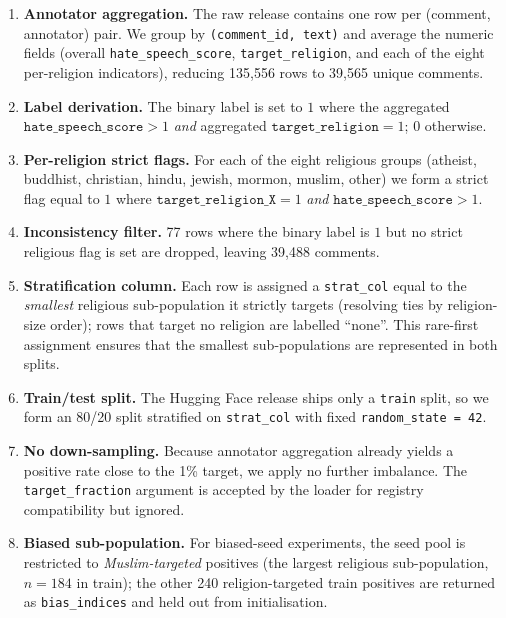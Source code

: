\documentclass[11pt]{article}
\begin{document}
\begin{enumerate}
    \item \textbf{Annotator aggregation.} The raw release contains one row per (comment, annotator) pair. We group by \texttt{(comment\_id, text)} and average the numeric fields (overall \texttt{hate\_speech\_score}, \texttt{target\_religion}, and each of the eight per-religion indicators), reducing 135{,}556 rows to 39{,}565 unique comments.
    \item \textbf{Label derivation.} The binary label is set to $1$ where the aggregated $\texttt{hate\_speech\_score} > 1$ \emph{and} aggregated $\texttt{target\_religion} = 1$; $0$ otherwise.
    \item \textbf{Per-religion strict flags.} For each of the eight religious groups (atheist, buddhist, christian, hindu, jewish, mormon, muslim, other) we form a strict flag equal to $1$ where $\texttt{target\_religion\_X} = 1$ \emph{and} $\texttt{hate\_speech\_score} > 1$.
    \item \textbf{Inconsistency filter.} 77 rows where the binary label is $1$ but no strict religious flag is set are dropped, leaving 39{,}488 comments.
    \item \textbf{Stratification column.} Each row is assigned a \texttt{strat\_col} equal to the \emph{smallest} religious sub-population it strictly targets (resolving ties by religion-size order); rows that target no religion are labelled ``none''. This rare-first assignment ensures that the smallest sub-populations are represented in both splits.
    \item \textbf{Train/test split.} The Hugging Face release ships only a \texttt{train} split, so we form an 80/20 split stratified on \texttt{strat\_col} with fixed \texttt{random\_state = 42}.
    \item \textbf{No down-sampling.} Because annotator aggregation already yields a positive rate close to the 1\% target, we apply no further imbalance. The \texttt{target\_fraction} argument is accepted by the loader for registry compatibility but ignored.
    \item \textbf{Biased sub-population.} For biased-seed experiments, the seed pool is restricted to \emph{Muslim-targeted} positives (the largest religious sub-population, $n=184$ in train); the other 240 religion-targeted train positives are returned as \texttt{bias\_indices} and held out from initialisation.
\end{enumerate}
\end{document}
